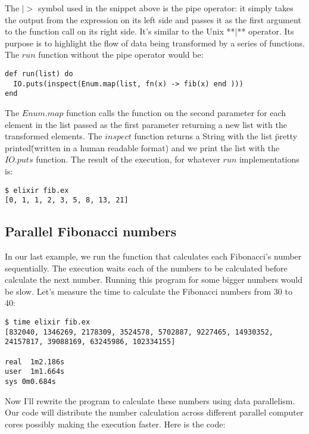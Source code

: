 The $|>$ symbol used in the snippet above is the pipe operator: it simply 
takes the output from the expression on its left side and passes it as the first
argument to the function call on its right side. It’s similar to the Unix **|** 
operator. Its purpose is to highlight the flow of data being transformed by a 
series of functions. The $run$ function without the pipe operator would be:

\begin{lstlisting}[label=dartMap,caption=Dart dynamic type]
def run(list) do
  IO.puts(inspect(Enum.map(list, fn(x) -> fib(x) end )))
end
\end{lstlisting}

The $Enum.map$ function calls the function on the second parameter for each 
element in the list passed as the first parameter returning a new list with the 
transformed elements. The $inspect$ function returns a String with the list
\"pretty printed\" (written in a human readable format) and we print the list with
the $IO.puts$ function. The result of the execution, for whatever $run$ 
implementations is:

\begin{verbatim}
$ elixir fib.ex 
[0, 1, 1, 2, 3, 5, 8, 13, 21]
\end{verbatim}


\subsection{Parallel Fibonacci numbers}

In our last example, we run the function that calculates each Fibonacci's number
sequentially. The execution waits each of the numbers to be calculated before 
calculate the next number. Running this program for some bigger numbers would be
slow. Let's measure the time to calculate the Fibonacci numbers from 30 to 40:

\begin{verbatim}
$ time elixir fib.ex 
[832040, 1346269, 2178309, 3524578, 5702887, 9227465, 14930352, 24157817, 39088169, 63245986, 102334155]

real  1m2.186s
user  1m1.664s
sys 0m0.684s
\end{verbatim}

Now I'll rewrite the program to calculate these numbers using data parallelism.
Our code will distribute the number calculation across different parallel 
computer cores possibly making the execution faster. Here is the code:

